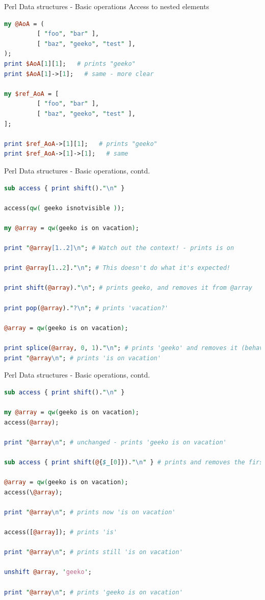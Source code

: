 \documentclass[10pt]{beamer}
\begin{document}
\begin{frame}[fragile]{Perl Data structures - Basic operations}
Access to nested elements
\begin{lstlisting}[language=perl]
my @AoA = (
         [ "foo", "bar" ],
         [ "baz", "geeko", "test" ],
);
print $AoA[1][1];   # prints "geeko"
print $AoA[1]->[1];   # same - more clear

my $ref_AoA = [
         [ "foo", "bar" ],
         [ "baz", "geeko", "test" ],
];

print $ref_AoA->[1][1];   # prints "geeko"
print $ref_AoA->[1]->[1];   # same 
\end{lstlisting}
\end{frame}


\begin{frame}[fragile]{Perl Data structures - Basic operations, contd. }

\begin{lstlisting}[language=perl]
sub access { print shift()."\n" }

access(qw( geeko isnotvisible ));

my @array = qw(geeko is on vacation);

print "@array[1..2]\n"; # Watch out the context! - prints is on

print @array[1..2]."\n"; # This doesn't do what it's expected!

print shift(@array)."\n"; # prints geeko, and removes it from @array

print pop(@array)."?\n"; # prints 'vacation?'

@array = qw(geeko is on vacation);

print splice(@array, 0, 1)."\n"; # prints 'geeko' and removes it (behaves like shift)
print "@array\n"; # prints 'is on vacation'
\end{lstlisting}
\end{frame}

\begin{frame}[fragile]{Perl Data structures - Basic operations, contd.}
\begin{lstlisting}[language=perl]
sub access { print shift()."\n" }

my @array = qw(geeko is on vacation);
access(@array);

print "@array\n"; # unchanged - prints 'geeko is on vacation'

sub access { print shift(@{$_[0]})."\n" } # prints and removes the first element of arrayref

@array = qw(geeko is on vacation);
access(\@array);

print "@array\n"; # prints now 'is on vacation'

access([@array]); # prints 'is'

print "@array\n"; # prints still 'is on vacation'

unshift @array, 'geeko';

print "@array\n"; # prints 'geeko is on vacation'
\end{lstlisting}
\end{frame}
\end{document}
